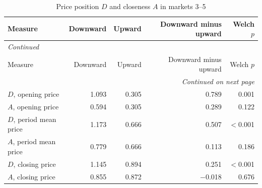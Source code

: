 \footnotesize
\begin{longtable}{lrrrr}
\caption{Price position $D$ and closeness $A$ in markets 3--5}\label{tab:app-human-closeness}\\
\toprule
Measure & Downward & Upward & Downward minus upward & Welch $p$ \\
\midrule
\endfirsthead
\multicolumn{5}{l}{\textit{Continued}}\\
\toprule
Measure & Downward & Upward & Downward minus upward & Welch $p$ \\
\midrule
\endhead
\midrule
\multicolumn{5}{r}{\textit{Continued on next page}}\\
\endfoot
\bottomrule
\endlastfoot
$D$, opening price & 1.093 & 0.305 & 0.789 & 0.001 \\
$A$, opening price & 0.594 & 0.305 & 0.289 & 0.122 \\
$D$, period mean price & 1.173 & 0.666 & 0.507 & $<$0.001 \\
$A$, period mean price & 0.779 & 0.666 & 0.113 & 0.186 \\
$D$, closing price & 1.145 & 0.894 & 0.251 & $<$0.001 \\
$A$, closing price & 0.855 & 0.872 & $-$0.018 & 0.676 \\
\end{longtable}
